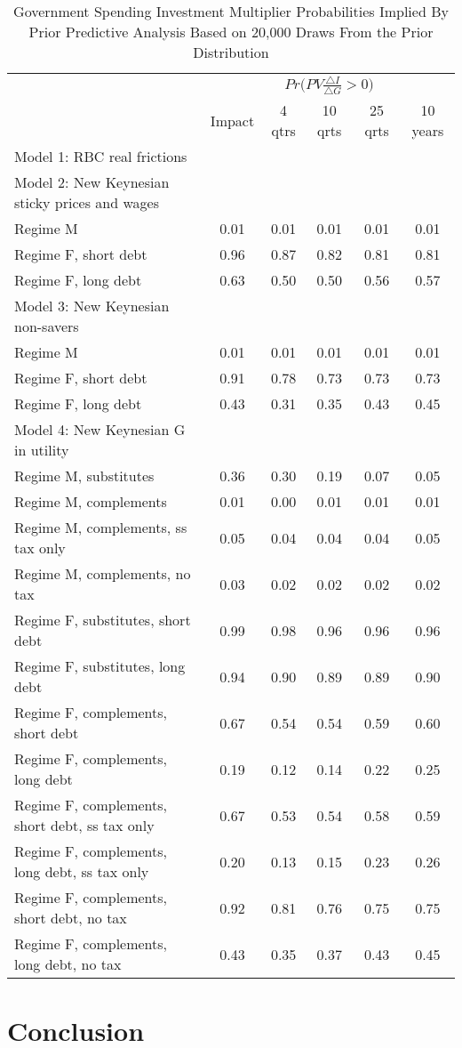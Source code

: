 \documentclass[letterpaper,12pt]{article}%
\begin{document}
\begin{table}[H]
    \centering
    \caption{Government Spending Investment Multiplier Probabilities Implied By Prior Predictive Analysis Based on 20,000 Draws From the Prior Distribution}
    \begin{tabular}{l c c c c c}
    \toprule
        & \multicolumn{5}{c}{$Pr\Big(PV \frac{\triangle I}{\triangle G}>0\Big)$}\\
        \cmidrule{2-6}
        & Impact & 4 qtrs & 10 qrts & 25 qrts & 10 years \\
        \midrule
     Model 1: RBC real frictions &    &   &   &   &  \\
     Model 2: New Keynesian sticky prices and wages   &    &   &   &   &   \\
     \quad Regime M &  0.01 &  0.01 & 0.01  & 0.01 &  0.01 \\
     \quad Regime F, short debt &   0.96 &  0.87 & 0.82 & 0.81  & 0.81 \\
     \quad Regime F, long debt &  0.63 & 0.50 & 0.50 & 0.56 & 0.57  \\
     Model 3: New Keynesian non-savers &    &   &   &   &  \\
     \quad Regime M &  0.01 &  0.01 & 0.01 & 0.01  & 0.01 \\
     \quad Regime F, short debt &  0.91 & 0.78 & 0.73 & 0.73 & 0.73  \\
     \quad Regime F, long debt &   0.43  &  0.31 & 0.35 & 0.43  & 0.45 \\
     Model 4: New Keynesian G in utility &    &   &   &   &  \\
     \quad Regime M, substitutes &   0.36 & 0.30 & 0.19 & 0.07 & 0.05  \\
     \quad Regime M, complements &   0.01  & 0.00  & 0.01  & 0.01  & 0.01  \\
     \quad Regime M, complements, ss tax only &  0.05 &  0.04  & 0.04 & 0.04  & 0.05  \\
     \quad Regime M, complements, no tax &   0.03 & 0.02 &  0.02  & 0.02  & 0.02 \\
     \quad Regime F, substitutes, short debt &   0.99 &  0.98 & 0.96  & 0.96  & 0.96 \\
     \quad Regime F, substitutes, long debt &   0.94 &  0.90 &  0.89 & 0.89 & 0.90 \\
     \quad Regime F, complements, short debt &  0.67 & 0.54  &  0.54 & 0.59 & 0.60  \\
     \quad Regime F, complements, long debt &   0.19 & 0.12 & 0.14 & 0.22  & 0.25 \\
     \quad Regime F, complements, short debt, ss tax only &  0.67 & 0.53 & 0.54  & 0.58 & 0.59 \\
     \quad Regime F, complements, long debt, ss tax only &  0.20  & 0.13 & 0.15  & 0.23  &  0.26 \\
     \quad Regime F, complements, short debt, no tax &  0.92 & 0.81   & 0.76  & 0.75  & 0.75 \\
     \quad Regime F, complements, long debt, no tax &   0.43 & 0.35 & 0.37  & 0.43 & 0.45 \\
    \bottomrule    
    \end{tabular}
    \label{tab:my_label}
\end{table}


\section{Conclusion}
\end{document}
